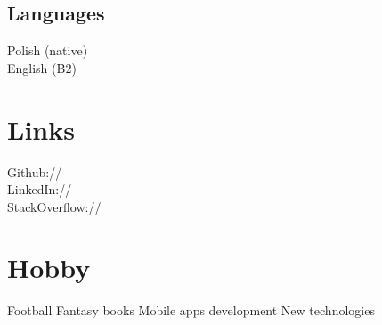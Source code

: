 \documentclass[]{deedy-resume-openfont}
\begin{document}
\begin{minipage}[t]{0.33\textwidth}
\subsection{Languages}
Polish (native) \\
English (B2)
\sectionsep


\section{Links} 
Github:// \href{github.com/emlagowski}{} \\
LinkedIn://  \href{https://www.linkedin.com/in/marcinlagowski}{} \\
StackOverflow://  \href{http://stackoverflow.com/users/3233685/marcin-lagowski}{} 
\sectionsep


\section{Hobby}
Football \textbullet{}   
Fantasy books \textbullet{} 
Mobile apps development \textbullet{} 
New technologies \\

%
%

\end{minipage} 
\hfill
\end{document}
